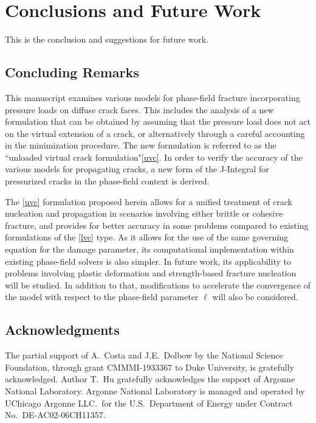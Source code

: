 \chapter{Conclusions and Future Work}
\label{section: Conclusion}

This is the conclusion and suggestions for future work.

\section{Concluding Remarks}

This manuscript examines various models for phase-field fracture incorporating pressure loads on diffuse crack faces.  This includes the analysis of a new formulation that can be obtained by assuming that the pressure load does not act on the virtual extension of a crack, or alternatively through a careful accounting in the minimization procedure. The new formulation is referred to as the 
 ``unloaded virtual crack formulation"\eqref{uvc}. In order to verify the accuracy of the various models for propagating cracks, a new form of the J-Integral for pressurized cracks in the phase-field context is derived.

The \eqref{uvc} formulation proposed herein allows for a unified treatment of crack nucleation and propagation in scenarios involving either brittle or cohesive fracture, and provides for better accuracy in some problems compared to existing formulations of the \eqref{lvc} type. As it allows for the use of the same governing equation for the damage parameter, its computational implementation within existing phase-field solvers is also simpler. In future work, its applicability to problems involving plastic deformation and strength-based fracture nucleation will be studied. In addition to that, modifications to accelerate the convergence of the model with respect to the phase-field parameter $\ell$ will also be considered.

\section{Acknowledgments}

The partial support of A.\ Costa and  J.E.\ Dolbow by the National Science Foundation, through grant CMMMI-1933367 to Duke University, is gratefully acknowledged.  Author T.\ Hu gratefully acknowledges the support of Argonne National Laboratory.  Argonne National Laboratory is managed and operated by UChicago Argonne LLC.\ for the U.S.\ Department of Energy under Contract No.\ DE-AC02-06CH11357.


